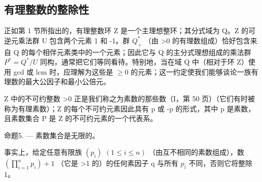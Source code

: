 \subsection{有理整数的整除性}

正如第 1 节所指出的，有理整数环 Z 是一个主理想整环；其分式域为 Q。Z 的可逆元乘法群 U 包含两个元素 1 和 -1。群 \(Q_{+}^{*}\) （由 \textgreater0 的有理数组成）恰好包含来自 Q 的每个相伴元素类中的一个元素；因此它与 Q 的主分式理想组成的乘法群 \(P^{*} = Q^{*}/U\) 同构，通常把它们等同看待。特别地，当在域 Q 中（相对于环 Z）使用 gcd 或 lcm 时，应理解为这些是 \(\geqslant 0\) 的元素；这一约定使我们能够谈论一族有理数的最大公因子和最小公倍元。

Z 中的不可约整数 \textgreater0 正是我们称之为素数的那些数（I，第 50 页）（它们有时被称为有理素数）；Z 的每个不可约元素因此具有 p 或 -p 的形式，其中 p 是素数，且素数集合 P 是 Z 的不可约元素的一个代表系。

命题5. --- 素数集合是无限的。

事实上，给定任意有限族 \((p_{i})\) \((1 \leqslant i \leqslant n)\) （由互不相同的素数组成），数 \(\left(\prod_{i=1}^{n} p_{i}\right) + 1\) （它是 \textgreater1 的）的任何素因子 q 与所有 \(p_{i}\) 不同，否则它将整除 1。

